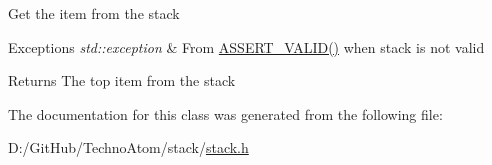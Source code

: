 Get the item from the stack 
\begin{DoxyExceptions}{Exceptions}
{\em std\+::exception} & From \hyperlink{stack_8h_a4ad7af85cae2910ffcf6bfbcb8278886}{A\+S\+S\+E\+R\+T\+\_\+\+V\+A\+L\+I\+D()} when stack is not valid \\
\hline
\end{DoxyExceptions}
\begin{DoxyReturn}{Returns}
The top item from the stack 
\end{DoxyReturn}


The documentation for this class was generated from the following file\+:\begin{DoxyCompactItemize}
\item 
D\+:/\+Git\+Hub/\+Techno\+Atom/stack/\hyperlink{stack_8h}{stack.\+h}\end{DoxyCompactItemize}

